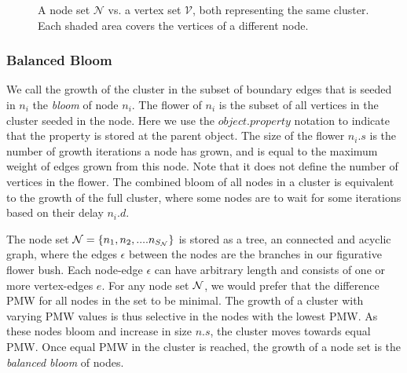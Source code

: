 \begin{figure}
 \centering
  \caption{A node set $\mathcal{N}$ vs. a vertex set $\mathcal{V}$, both representing the same cluster. Each shaded area covers the vertices of a different  node.}\label{fig:nodesetpmw}
\end{figure}

\subsubsection{Balanced Bloom}

We call the growth of the cluster in the subset of boundary edges that is seeded in $n_i$ the \emph{bloom} of node $n_i$. The flower of $n_i$ is the subset of all vertices in the cluster seeded in the node. Here we use the $object.property$ notation to indicate that the property is stored at the parent object. The size of the flower $n_i.s$ is the number of growth iterations a node has grown, and is equal to the maximum weight of edges grown from this node. Note that it does not define the number of vertices in the flower. The combined bloom of all nodes in a cluster is equivalent to the growth of the full cluster, where some nodes are to wait for some iterations based on their delay $n_i.d$.

The node set $\mathcal{N} = \{n_1, n_2, .... n_{S_{\mathcal{N}}}\}$ is stored as a tree, an connected and acyclic graph, where the edges $\epsilon$ between the nodes are the branches in our figurative flower bush. Each node-edge $\epsilon$ can have arbitrary length and consists of one or more vertex-edges $e$. For any node set $\mathcal{N}$, we would prefer that the difference PMW for all nodes in the set to be minimal. The growth of a cluster with varying PMW values is thus selective in the nodes with the lowest PMW. As these nodes bloom and increase in size $n.s$, the cluster moves towards equal PMW. Once equal PMW in the cluster is reached, the growth of a node set is the \emph{balanced bloom} of nodes.

